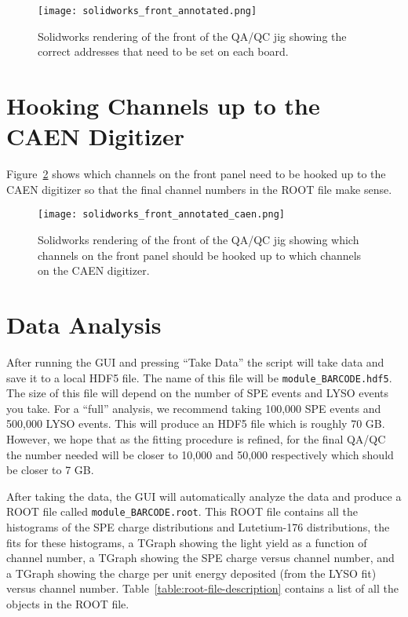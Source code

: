 \documentclass[12pt,openright,twoside]{report}
\begin{document}
\begin{figure}
\centering
\texttt{[image: solidworks\_front\_annotated.png]}
\caption{Solidworks rendering of the front of the QA/QC jig showing the correct addresses that need to be set on each board.}
\label{fig:solidworks-front-annotated}
\end{figure}

\section{Hooking Channels up to the CAEN Digitizer}
Figure~\ref{fig:solidworks-front-annotated-caen} shows which channels on the
front panel need to be hooked up to the CAEN digitizer so that the final
channel numbers in the ROOT file make sense.

\begin{figure}
\centering
\texttt{[image: solidworks\_front\_annotated\_caen.png]}
\caption{Solidworks rendering of the front of the QA/QC jig showing which channels on the front panel should be hooked up to which channels on the CAEN digitizer.}
\label{fig:solidworks-front-annotated-caen}
\end{figure}

\section{Data Analysis}
After running the GUI and pressing ``Take Data'' the script will take data and
save it to a local HDF5 file. The name of this file will be
\texttt{module\_BARCODE.hdf5}. The size of this file will depend on the number
of SPE events and LYSO events you take. For a ``full'' analysis, we recommend
taking 100,000 SPE events and 500,000 LYSO events. This will produce an HDF5
file which is roughly 70 GB. However, we hope that as the fitting procedure is
refined, for the final QA/QC the number needed will be closer to 10,000 and
50,000 respectively which should be closer to 7 GB.

After taking the data, the GUI will automatically analyze the data and produce
a ROOT file called \texttt{module\_BARCODE.root}. This ROOT file contains all
the histograms of the SPE charge distributions and Lutetium-176 distributions,
the fits for these histograms, a TGraph showing the light yield as a function
of channel number, a TGraph showing the SPE charge versus channel number, and a
TGraph showing the charge per unit energy deposited (from the LYSO fit) versus
channel number. Table~\ref{table:root-file-description} contains a list of all
the objects in the ROOT file.
\end{document}
